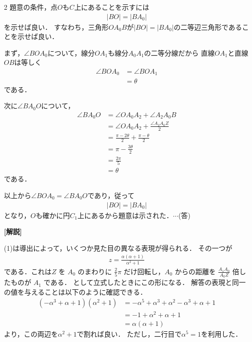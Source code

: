 \documentclass[../../../../main.tex]{subfiles}
\begin{document}
\begin{multicols}{2}
  題意の条件，点$O$も$C$上にあることを示すには
  \begin{align*}
    |BO| = |BA_0|
  \end{align*}
  を示せば良い．
  すなわち，三角形$OA_0B$が$|BO| = |BA_0|$の二等辺三角形であることを示せば良い．

  まず，$\angle BOA_0$について，線分$OA_1$も線分$A_0A_1$の二等分線だから
  直線$OA_1$と直線$OB$は等しく
  \begin{align*}
    \angle BOA_0
     & = \angle BOA_1 \\
     & = \theta
  \end{align*}
  である．

  次に$\angle BA_0O$について，
  \begin{align*}
    \angle BA_0O
     & = \angle OA_0A_2 + \angle A_2A_0B              \\
     & = \angle OA_0A_2 + \frac{\angle A_2A_0Z}{2}    \\
     & = \frac{\pi-2\theta}{2} + \frac{\pi-\theta}{2} \\
     & = \pi-\frac{3\theta}{2}                        \\
     & = \frac{2\pi}{5}                               \\
     & = \theta
  \end{align*}
  である．

  以上から$\angle BOA_0=\angle BA_0O$であり，従って
  \begin{align*}
    |BO| = |BA_0|
  \end{align*}
  となり，$O$も確かに円$C_1$上にあるから題意は示された．$\cdots$(答)


  \vspace{10pt}
  {\bf[解説]}

  (1)は導出によって，いくつか見た目の異なる表現が得られる．
  その一つが
  \begin{align*}
    z = \frac{\alpha(\alpha+1)}{\alpha^2+1}
  \end{align*}
  である．これは$Z$ を $A_0$ のまわりに $\frac{2}{5}\pi$ だけ回転し，$A_0$ からの距離を $\frac{A_1A_0}{A_0Z}$ 倍したものが $A_1$ である．
  として立式したときにこの形になる．
  解答の表現と同一の値を与えることは以下のように確認できる．
  \begin{align*}
    (-\alpha^3+\alpha+1)(\alpha^2+1)
     & = -\alpha^5+\alpha^3+\alpha^2-\alpha^3+\alpha+1 \\
     & = -1 +\alpha^2+\alpha+1                         \\
     & = \alpha(\alpha+1)
  \end{align*}
  より，この両辺を$\alpha^2+1$で割れば良い．
  ただし，二行目で$\alpha^5=1$を利用した．


\end{multicols}
\end{document}
